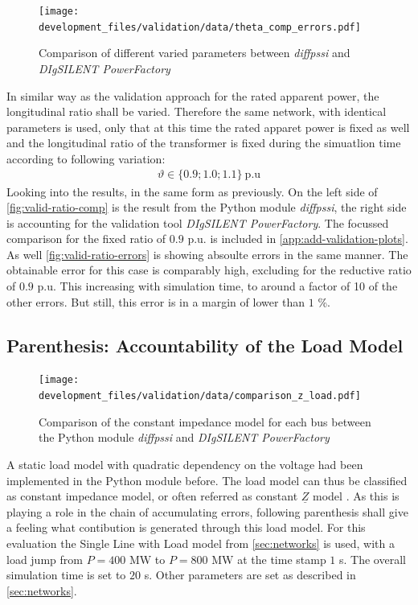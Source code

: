 \begin{figure}[htbp!]
    \centering
    \texttt{[image: development\_files/validation/data/theta\_comp\_errors.pdf]}
    \caption{Comparison of different varied parameters between \textit{diffpssi} and \textit{DIgSILENT PowerFactory}}
    \label{fig:valid-ratio-errors}
\end{figure}

In similar way as the validation approach for the rated apparent power, the longitudinal ratio shall be varied. 
Therefore the same network, with identical parameters is used, only that at this time the rated apparet power is fixed as well and the longitudinal ratio of the transformer is fixed during the simuatlion time according to following variation:
\begin{align}
    \vartheta \in \{ 0.9; 1.0; 1.1 \}~\mathrm{p.u} \label{eq:variation-ratio}
\end{align}
Looking into the results, in the same form as previously.
On the left side of \autoref{fig:valid-ratio-comp} is the result from the Python module \textit{diffpssi}, the right side is accounting for the validation tool \textit{DIgSILENT PowerFactory}.
The focussed comparison for the fixed ratio of $0.9$ p.u. is included in \autoref{app:add-validation-plots}.
As well \autoref{fig:valid-ratio-errors} is showing absoulte errors in the same manner.
The obtainable error for this case is comparably high, excluding for the reductive ratio of $0.9$ p.u.
This increasing with simulation time, to around a factor of 10 of the other errors. 
But still, this error is in a margin of lower than $1$ \%. 


\subsection{Parenthesis: Accountability of the Load Model}
\label{sec:validation-load-model}

\begin{figure}[htbp!]
    \centering
    \texttt{[image: development\_files/validation/data/comparison\_z\_load.pdf]}
    \caption[Comparison of the constant impedance model for each bus]{Comparison of the constant impedance model for each bus between the Python module \textit{diffpssi} and \textit{DIgSILENT PowerFactory}}
    \label{fig:z-comp}
\end{figure}

A static load model with quadratic dependency on the voltage had been implemented in the Python module before.
The load model can thus be classified as constant impedance model, or often referred as constant $\underline{Z}$ model \autocite{IEEELoadModeling_2022}. 
As this is playing a role in the chain of accumulating errors, following parenthesis shall give a feeling what contibution is generated through this load model.
For this evaluation the Single Line with Load model from \autoref{sec:networks} is used, with a load jump from $P=400\text{ MW}$ to $P=800\text{ MW}$ at the time stamp $1$ s.
The overall simulation time is set to $20$ s.
Other parameters are set as described in \autoref{sec:networks}.

